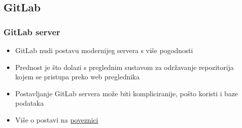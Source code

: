 \subsection{GitLab}

\begin{frame}
\frametitle{GitLab server}
\begin{itemize}
	\item GitLab nudi postavu modernijeg servera s više pogodnosti
	\item Prednost je što dolazi s preglednim sustavom za održavanje repozitorija kojem se pristupa preko web preglednika
	\item Postavljanje GitLab servera može biti kompliciranije, pošto koristi i baze podataka
	\item Više o postavi na \href{https://git-scm.com/book/en/v2/Git-on-the-Server-Gitlab}{poveznici}
\end{itemize}
\end{frame}